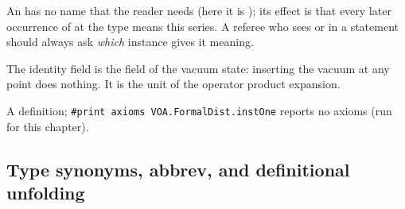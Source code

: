 \begin{dictionary}
An  has no name that the reader needs (here it is
); its effect is that every later occurrence of  at the type
 means this series. A referee who sees  or  in a statement should
always ask \emph{which} instance gives it meaning.
\end{dictionary}

\begin{physics}
The identity field is the field of the vacuum state: inserting the vacuum at any point does
nothing. It is the unit of the operator product expansion.
\end{physics}

\begin{status}
A definition; \texttt{\#print axioms VOA.FormalDist.instOne} reports no axioms (run for this
chapter).
\end{status}

\subsection{Type synonyms, abbrev, and definitional unfolding}\label{ch01:sec:synonyms}

